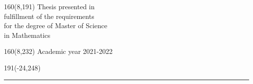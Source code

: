 %
\begin{textblock}{160}(8,191)
\textblockcolour{}
\vspace{-\parskip}
\flushright
Thesis presented in\\[4.5pt]
fulfillment of the requirements\\[4.5pt]
for the degree of Master of Science\\[4.5pt]
in Mathematics\\
\end{textblock}
%
\begin{textblock}{160}(8,232)
\textblockcolour{}
\vspace{-\parskip}
\flushright
Academic year 2021-2022
\end{textblock}
%
\begin{textblock}{191}(-24,248)
{\color{blueline}\rule{550pt}{5.5pt}}
\end{textblock}
%
\vfill

